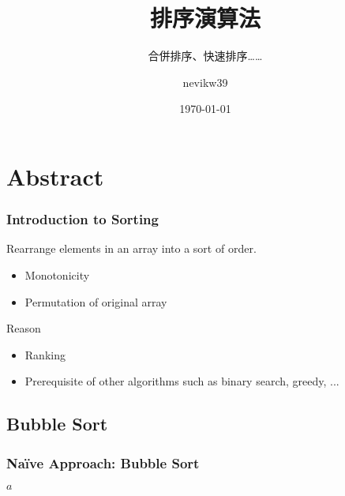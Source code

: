 \documentclass{beamer}
\title{排序演算法}
\subtitle{合併排序、快速排序……}
\author{nevikw39}
\institute{點石學園}
\date{\today}
\begin{document}
\frame{\titlepage}

\frame{\tableofcontents}

\section{Abstract}

\frame
{
	\frametitle{Introduction to Sorting}
	
	\begin{definition}[Sort]
		Rearrange elements in an array into a sort of order.
		
		\begin{itemize}
			\item Monotonicity
			\item Permutation of original array
		\end{itemize}
	\end{definition}
	\pause
	
	\begin{block}{Reason}
		\begin{itemize}
			\item Ranking
			\item Prerequisite of other algorithms such as binary search, greedy, ...
		\end{itemize}
	\end{block}
}

%	
%	

\subsection{Bubble Sort}

\frame
{
	\frametitle{Na\"{i}ve Approach: Bubble Sort}
	
	\begin{algorithmic}
            \For{$i\in[0, n-1)$}
                \For{$j\in[0, n-1-i)$}
						\State{}
					\EndIf
				\EndFor
            \EndFor
            \State\Return$a$
        \EndProcedure
	\end{algorithmic}
}
\end{document}
